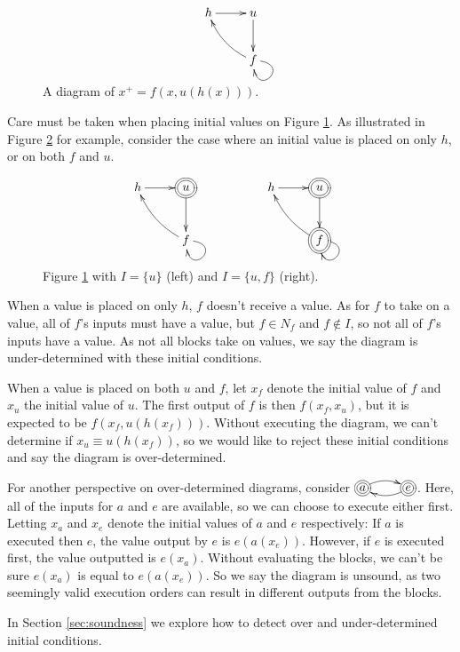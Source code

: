 \documentclass[twocolumn]{article}
\newcommand*{\Inputs}[1]{N_{#1}}
\begin{document}
\begin{figure}[h]
\[
    \xymatrix {
        h \ar[r] & u \ar[d] \\
        & f \ar@/^/[lu] \ar@(r, d)[]
    }
\]
    \caption{A diagram of $x^+=f(x,u(h(x)))$.}
    \label{fig:v2dynamical}
\end{figure}

Care must be taken when placing initial values on Figure \ref{fig:v2dynamical}. As illustrated in Figure \ref{fig:meow} for example, consider the case where an initial value is placed on only $h$, or on both $f$ and $u$.

\begin{figure}[h]
\[
    \xymatrix {
        h \ar[r] & *++[o][F=]{u} \ar[d] && h \ar[r] & *++[o][F=]{u} \ar[d] \\
        & f \ar@/^/[lu] \ar@(r, d)[] && & *++[o][F=]{f} \ar@/^/[lu] \ar@(r, d)[]
    }
\]
    \caption{Figure \ref{fig:v2dynamical} with $I=\{u\}$ (left) and $I=\{u, f\}$ (right).}
    \label{fig:meow}
\end{figure}

When a value is placed on only $h$, $f$ doesn't receive a value. As for $f$ to take on a value, all of $f$'s inputs must have a value, but $f\in\Inputs{f}$ and $f\not\in I$, so not all of $f$'s inputs have a value. As not all blocks take on values, we say the diagram is under-determined with these initial conditions.

When a value is placed on both $u$ and $f$, let $x_f$ denote the initial value of $f$ and $x_u$ the initial value of $u$. The first output of $f$ is then $f(x_f, x_u)$, but it is expected to be $f(x_f, u(h(x_f)))$. Without executing the diagram, we can't determine if $x_u\equiv u(h(x_f))$, so we would like to reject these initial conditions and say the diagram is over-determined.

For another perspective on over-determined diagrams, consider $\xymatrix@1{*++++[o][F=]{a} \ar@/^/[r] & *++++[o][F=]{e} \ar@/^/[l]}$. Here, all of the inputs for $a$ and $e$ are available, so we can choose to execute either first. Letting $x_a$ and $x_e$ denote the initial values of $a$ and $e$ respectively: If $a$ is executed then $e$, the value output by $e$ is $e(a(x_e))$. However, if $e$ is executed first, the value outputted is $e(x_a)$. Without evaluating the blocks, we can't be sure $e(x_a)$ is equal to $e(a(x_e))$. So we say the diagram is unsound, as two seemingly valid execution orders can result in different outputs from the blocks.

In Section \ref{sec:soundness} we explore how to detect over and under-determined initial conditions.
\end{document}
